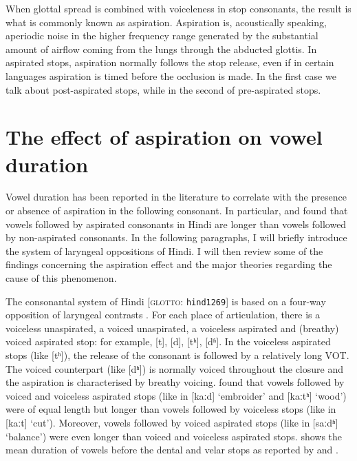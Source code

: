 \documentclass[11pt,a4paper,oneside,openany]{memoir}\usepackage[]{graphicx}\usepackage[]{color}
\begin{document}
When glottal spread is combined with voiceleness in stop consonants, the result is what is commonly known as aspiration.
Aspiration is, acoustically speaking, aperiodic noise in the higher frequency range generated by the substantial amount of airflow coming from the lungs through the abducted glottis.
In aspirated stops, aspiration normally follows the stop release, even if in certain languages aspiration is timed before the occlusion is made.
In the first case we talk about post-aspirated stops, while in the second of pre-aspirated stops.


\section{The effect of aspiration on vowel duration}
\label{s:aspiration}

Vowel duration has been reported in the literature to correlate with the presence or absence of aspiration in the following consonant.
In particular, \citet{maddieson1976} and \citet{durvasula2012} found that vowels followed by aspirated consonants in Hindi are longer than vowels followed by non-aspirated consonants.
In the following paragraphs, I will briefly introduce the system of laryngeal oppositions of Hindi.
I will then review some of the findings concerning the aspiration effect and the major theories regarding the cause of this phenomenon.

The consonantal system of Hindi [\textsc{glotto}: \texttt{hind1269}] is based on a four-way opposition of laryngeal contrasts \citep{ohala1983}.
For each place of articulation, there is a voiceless unaspirated, a voiced unaspirated, a voiceless aspirated and (breathy) voiced aspirated stop: for example, [t], [d], [tʰ], [dʱ].
In the voiceless aspirated stops (like [tʰ]), the release of the consonant is followed by a relatively long VOT.
The voiced counterpart (like [dʱ]) is normally voiced throughout the closure and the aspiration is characterised by breathy voicing.
\citet{maddieson1976} found that vowels followed by voiced and voiceless aspirated stops (like in [kaːd] `embroider' and [kaːtʰ] `wood') were of equal length but longer than vowels followed by voiceless stops (like in [kaːt] `cut').
Moreover, vowels followed by voiced aspirated stops (like in [saːdʱ] `balance') were even longer than voiced and voiceless aspirated stops.
 shows the mean duration of vowels before the dental and velar stops as reported by \citet{maddieson1976} and \citet{lampp2004}.

\end{document}

